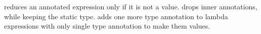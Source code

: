 
reduces an annotated expression only if it is not a value.
 drops inner
annotations, while keeping the static type.
 adds one more type annotation to
lambda expressions with only single type annotation to make them values.

\begin{comment}
\Rref{step-beta} deals with a special case, that occurs when the
argument of a function is a non-annotatted lambda expression.
With bi-directional type-checking an expression such as:
($[[\f.f 1:(Int -> Int -> Int) : (Int -> Int -> Int)]]$)($[[\x.x]]$)
\bruno{example here.} \baber{Done.}
is well-typed, since bi-directional type-checking propagates
type information to the arguments. Thus, the dynamic semantics
needs to deal with such programs.
We emphasize the fact that $[[\x.e]]$ is not a value in \cal.
The rule follows the same approach as
\rref{step-beta} except that both of the input types are kept with
$[[\x.e]]$ during substitution i.e $[[\x.e:A2:A1]]$. \Rref{step-ann}
reduces an annotated expression only if it is not a value and $[[e]]$
reduces to some $[[e']]$. \Rref{step-rmann} drops inner
annotations. \Rref{step-lamann} adds one more type annotation with
lambda expressions having single type annotation to make them values.
\end{comment}

